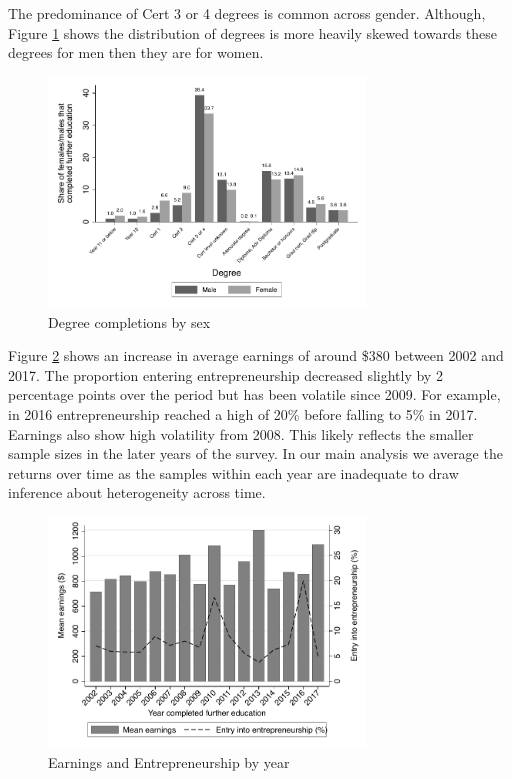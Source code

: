 \documentclass[12pt, a4paper]{article}
\begin{document}
The predominance of Cert 3 or 4 degrees is common across gender. Although, Figure \ref{fig:degbysex} shows the distribution of degrees is more heavily skewed towards these degrees for men then they are for women. 

\singlespacing
\begin{figure}[htbp]
\centering
\caption{Degree completions by sex}
\vspace{0.5cm}
  \label{fig:degbysex}
    \includegraphics[width=0.75\textwidth]{_figures/completions_by_gender_deg.pdf}
\end{figure}
\doublespacing

Figure \ref{fig:yearearnent} shows an increase in average earnings of around \$380 between 2002 and 2017. The proportion entering entrepreneurship decreased slightly by 2 percentage points over the period but has been volatile since 2009. For example, in 2016 entrepreneurship reached a high of 20\% before falling to 5\% in 2017. Earnings also show high volatility from 2008. This likely reflects the smaller sample sizes in the later years of the survey. In our main analysis we average the returns over time as the samples within each year are inadequate to draw inference about heterogeneity across time. 

\singlespacing
\begin{figure}[htbp]
\centering
\caption{Earnings and Entrepreneurship by year}
\vspace{0.5cm}
  \label{fig:yearearnent}
    \includegraphics[width=0.75\textwidth]{_figures/mean_earnings_ent_year.pdf}
\end{figure}
\doublespacing
\end{document}
